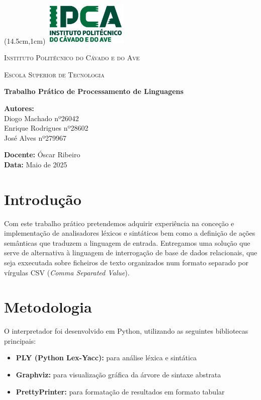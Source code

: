 \documentclass[12pt]{article}
\begin{document}
	\begin{titlepage}
		\begin{textblock*}{3cm}(14.5cm,1cm) %
			\includegraphics[width=4cm]{images/IPCA-Logo_v2.png}
		\end{textblock*}
		
		\centering
		\vspace*{1cm}
		{\scshape\Large Instituto Politécnico do Cávado e do Ave \par}
		{\scshape\large Escola Superior de Tecnologia\par}
		\vspace{2cm}
		
		{\huge\bfseries Trabalho Prático de Processamento de Linguagens \par}
		\vspace{2cm}
		
		\begin{flushleft}
			\textbf{Autores:} \\
			Diogo Machado nº26042 \\
			Enrique Rodrigues nº28602 \\
			José Alves nº279967
		\end{flushleft}
		
		\vfill
		
		\begin{flushright}
			\textbf{Docente:} Óscar Ribeiro\\
			\textbf{Data:} Maio de 2025
		\end{flushright}
	\end{titlepage}	
\section{Introdução}

Com este trabalho prático pretendemos adquirir experiência na conceção e implementação  de analisadores léxicos e sintáticos bem como a definição de ações semânticas que traduzem a linguagem de entrada. Entregamos uma solução que serve de alternativa à linguagem de interrogação de base de dados relacionais, que seja exxecutada sobre ficheiros de texto organizados num formato separado por vírgulas CSV (\textit{Comma Separated Value}).
\section{Metodologia}
O interpretador foi desenvolvido em Python, utilizando as seguintes bibliotecas principais:
\begin{itemize}
    \item \textbf{PLY (Python Lex-Yacc):} para análise léxica e sintática
    \item \textbf{Graphviz:} para visualização gráfica da árvore de sintaxe abstrata
    \item \textbf{PrettyPrinter:} para formatação de resultados em formato tabular
\end{itemize}
\end{document}
